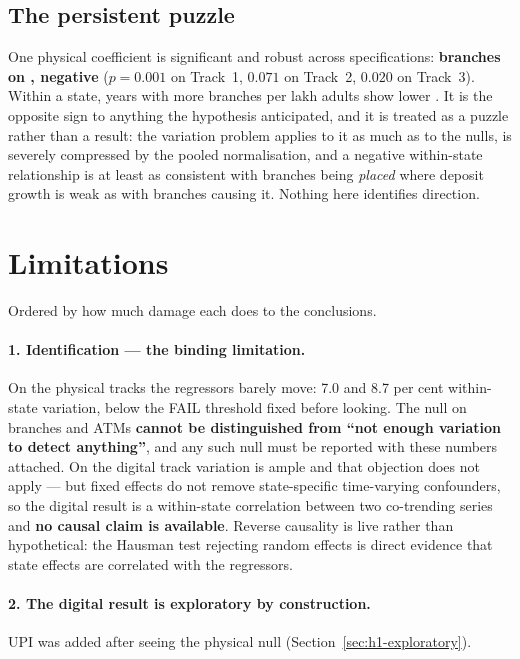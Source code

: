 \subsection{The persistent puzzle}

One physical coefficient is significant and robust across specifications: \textbf{branches on
\Usage{}, negative} ($p = 0.001$ on Track~1, $0.071$ on Track~2, $0.020$ on Track~3). Within a
state, years with more branches per lakh adults show lower \Usage{}. It is the opposite sign to
anything the hypothesis anticipated, and it is treated as a puzzle rather than a result: the
variation problem applies to it as much as to the nulls, \Usage{} is severely compressed by the
pooled normalisation, and a negative within-state relationship is at least as consistent with
branches being \emph{placed} where deposit growth is weak as with branches causing it. Nothing here
identifies direction.

\section{Limitations}
\label{sec:h1-limitations}

Ordered by how much damage each does to the conclusions.

\paragraph{1. Identification --- the binding limitation.} On the physical tracks the regressors
barely move: 7.0 and 8.7 per cent within-state variation, below the FAIL threshold fixed before
looking. The null on branches and ATMs \textbf{cannot be distinguished from ``not enough variation
to detect anything''}, and any such null must be reported with these numbers attached. On the
digital track variation is ample and that objection does not apply --- but fixed effects do not
remove state-specific time-varying confounders, so the digital result is a within-state correlation
between two co-trending series and \textbf{no causal claim is available}. Reverse causality is live
rather than hypothetical: the Hausman test rejecting random effects is direct evidence that state
effects are correlated with the regressors.

\paragraph{2. The digital result is exploratory by construction.} UPI was added after seeing the
physical null (Section~\ref{sec:h1-exploratory}).

